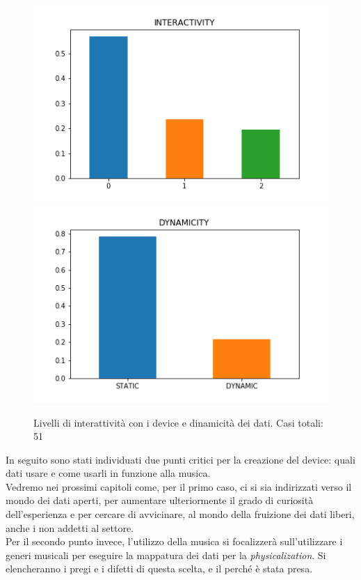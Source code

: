 \documentclass[12pt,a4paper]{report}
\begin{document}
\begin{figure}
	\begin{center}
		\includegraphics[scale=0.4]{Immagini/ENG_interactivity.png}
		\includegraphics[scale=0.4]{Immagini/ENG_dynamic.png}
		\caption{Livelli di interattività con i device e dinamicità dei dati. Casi totali: 51}
		\label{fig:interacivityandcuriosity}
	\end{center}
\end{figure}

In seguito sono stati individuati due punti critici per la creazione del device: quali dati usare e come usarli in funzione alla musica. \\

Vedremo nei prossimi capitoli come, per il primo caso, ci si sia indirizzati verso il mondo dei dati aperti, per aumentare ulteriormente il grado di curiosità dell'esperienza e per cercare di avvicinare, al mondo della fruizione dei dati liberi, anche i non addetti al settore.\\
Per il secondo punto invece, l'utilizzo della musica si focalizzerà sull'utilizzare i generi musicali per eseguire la mappatura dei dati per la \textit{physicalization}. Si elencheranno i pregi e i difetti di questa scelta, e il perché è stata presa.
\end{document}
